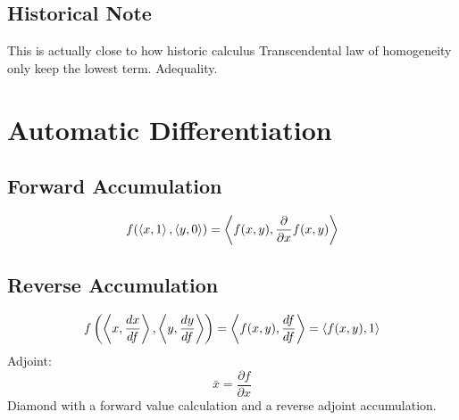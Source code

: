 \subsection{Historical Note}
This is actually close to how historic calculus 
Transcendental law of homogeneity only keep the lowest term.
Adequality.

\section{Automatic Differentiation}
\subsection{Forward Accumulation}
\[f(\left\langle x,1 \right\rangle,\left\langle y,0 \right\rangle) = \left\langle f(x,y),\frac{\partial}{\partial x}f(x,y) \right\rangle\]

\subsection{Reverse Accumulation}
\[f\left(\left\langle x,\frac{dx}{df} \right\rangle,\left\langle y,\frac{dy}{df} \right\rangle\right) = \left\langle f(x,y),\frac{df}{df} \right\rangle = \left\langle f(x,y),1 \right\rangle\]
Adjoint: 
\[\bar{x} = \frac{\partial f}{\partial x}\]
Diamond with a forward value calculation and a reverse adjoint accumulation.
